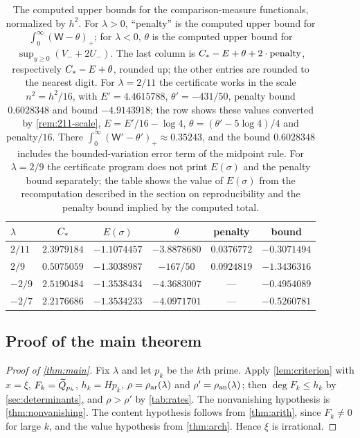 \begin{table}[ht]
\centering
\caption{The computed upper bounds for the comparison-measure functionals, normalized by $h^2$. For $\lambda>0$, ``penalty'' is the computed upper bound for $\int_0^\infty(\mathsf W-\theta)_+$; for $\lambda<0$, $\theta$ is the computed upper bound for $\sup_{y\ge0}(V_-+2U_-)$. The last column is $C_{*}-E+\theta+2\cdot\text{penalty}$, respectively $C_{*}-E+\theta$, rounded up; the other entries are rounded to the nearest digit. For $\lambda=2/11$ the certificate works in the scale $n^2=h^2/16$, with $E'=4.4615788$, $\theta'=-431/50$, penalty bound $0.6028348$ and bound $-4.9143918$; the row shows these values converted by \cref{rem:211-scale}, $E=E'/16-\log4$, $\theta=(\theta'-5\log4)/4$ and penalty${}/16$. There $\int_0^\infty(\mathsf W'-\theta')_+\approx0.35243$, and the bound $0.6028348$ includes the bounded-variation error term of the midpoint rule. For $\lambda=2/9$ the certificate program does not print $E(\sigma)$ and the penalty bound separately; the table shows the value of $E(\sigma)$ from the recomputation described in the section on reproducibility and the penalty bound implied by the computed total.}
\label{tab:analytic}
\begin{tabular}{@{}lccccc@{}}
\toprule
$\lambda$ & $C_{*}$ & $E(\sigma)$ & $\theta$ & penalty & bound\\
\midrule
$2/11$ & $2.3979184$ & $-1.1074457$ & $-3.8878680$ & $0.0376772$ & $-0.3071494$\\
$2/9$ & $0.5075059$ & $-1.3038987$ & $-167/50$ & $0.0924819$ & $-1.3436316$\\
$-2/9$ & $2.5190484$ & $-1.3538434$ & $-4.3683007$ & --- & $-0.4954089$\\
$-2/7$ & $2.2176686$ & $-1.3534233$ & $-4.0971701$ & --- & $-0.5260781$\\
\bottomrule
\end{tabular}
\end{table}

\subsection{Proof of the main theorem}\label{sec:proof-main}
\begin{proof}[Proof of \cref{thm:main}]
Fix $\lambda$ and let $p_k$ be the $k$th prime. Apply \cref{lem:criterion} with $x=\xi$, $F_k=\widetilde{Q}_{p_k}$, $h_k=Hp_k$, $\rho=\rho_{\mathrm{ar}}(\lambda)$ and $\rho'=\rho_{\mathrm{an}}(\lambda)$; then $\deg F_k\le h_k$ by \cref{sec:determinants}, and $\rho>\rho'$ by \cref{tab:rates}. The nonvanishing hypothesis is \cref{thm:nonvanishing}. The content hypothesis follows from \cref{thm:arith}, since $F_k\ne0$ for large $k$, and the value hypothesis from \cref{thm:arch}. Hence $\xi$ is irrational.
\end{proof}

